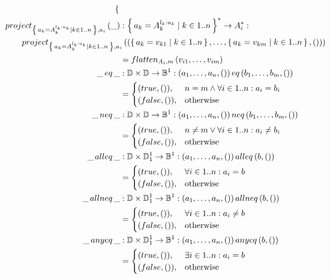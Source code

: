 \begin{defbox}
\begin{align*}
\begin{cases}
\end{cases} \\
\sproject{\set{a_k=A_k^{l_k:u_k} \mid k\in 1..n}}{a_i}{\_} &: \set{a_k=A_k^{l_k:u_k} \mid k\in 1..n}^{*} \to A_i^{*} : \\ \omit\rlap{$\displaystyle \qquad \sproject{\set{a_k=A_k^{l_k:u_k} \mid k\in 1..n}}{a_i}{(\set{a_k=v_{k1} \mid k\in 1..n}, \dots, \set{a_k=v_{km} \mid k\in 1..n}, ())}$} \\
&= \sflatten{A_i}{m}{v_{i1}, \dots, v_{im}} \\
\seq{\_}{\_} &: \sdom \times \sdom \to \sboolean^1 : \seq{(a_1, \dots, a_n, ())}{(b_1, \dots, b_m, ())} \\
&= \begin{cases}
(true, ()), & n = m \land \forall i \in 1..n : a_i = b_i \\
(false, ()), & \text{otherwise}
\end{cases} \\
\sneq{\_}{\_} &: \sdom \times \sdom \to \sboolean^1 : \sneq{(a_1, \dots, a_n, ())}{(b_1, \dots, b_m, ())} \\
&= \begin{cases}
(true, ()), & n \neq m \lor \forall i \in 1..n : a_i \neq b_i \\
(false, ()), & \text{otherwise}
\end{cases} \\
\salleq{\_}{\_} &: \sdom \times \ssingledom^1 \to \sboolean^1 : \salleq{(a_1, \dots, a_n, ())}{(b, ())} \\
&= \begin{cases}
(true, ()), & \forall i \in 1..n : a_i = b \\
(false, ()), & \text{otherwise}
\end{cases} \\
\sallneq{\_}{\_} &: \sdom \times \ssingledom^1 \to \sboolean^1 : \sallneq{(a_1, \dots, a_n, ())}{(b, ())} \\
&= \begin{cases}
(true, ()), & \forall i \in 1..n : a_i \neq b \\
(false, ()), & \text{otherwise}
\end{cases} \\
\sanyeq{\_}{\_} &: \sdom \times \ssingledom^1 \to \sboolean^1 : \sanyeq{(a_1, \dots, a_n, ())}{(b, ())} \\
&= \begin{cases}
(true, ()), & \exists i \in 1..n : a_i = b \\
(false, ()), & \text{otherwise}
\end{cases} \\

\end{align*}
\end{defbox}
